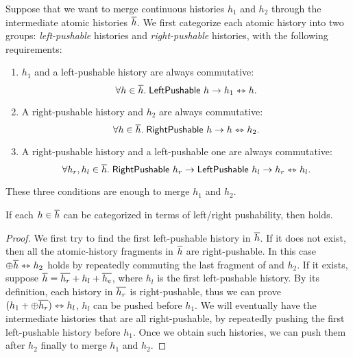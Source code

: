 Suppose that we want to merge continuous histories $h_1$ and $h_2$ through the intermediate atomic histories $\overline{h}$.
We first categorize each atomic history into two groups: \emph{left-pushable} histories and \emph{right-pushable} histories, with the following requirements:
\begin{enumerate}
\item $h_1$ and a left-pushable history are always commutative:
  \begin{displaymath}
    \forall h \in \overline{h}.\; \mathsf{LeftPushable}\ h \to h_1 \leftrightarrowtriangle h.
  \end{displaymath}
\item A right-pushable history and $h_2$ are always commutative:
  \begin{displaymath}
    \forall h \in \overline{h}.\; \mathsf{RightPushable}\ h \to h \leftrightarrowtriangle h_2.
  \end{displaymath}
\item A right-pushable history and a left-pushable one are always commutative:
  \begin{displaymath}
    \forall h_r, h_l \in \overline{h}.\; \mathsf{RightPushable}\ h_r \to \mathsf{LeftPushable}\ h_l \to h_r \leftrightarrowtriangle h_l.
  \end{displaymath}
\end{enumerate}

These three conditions are enough to merge $h_1$ and $h_2$.
\begin{theorem}\label{thm-push-imp-mgb}
  If each $h \in \overline{h}$ can be categorized in terms of left/right pushability, then  holds.
\end{theorem}
\begin{proof}
  We first try to find the first left-pushable history in $\overline{h}$.
  If it does not exist, then all the atomic-history fragments in $\overline{h}$ are right-pushable.
  In this case $\oplus \overline{h} \leftrightarrowtriangle h_2$ holds by repeatedly commuting the last fragment of  and $h_2$.
  If it exists, suppose $\overline{h} = \overline{h_r} + h_l + \overline{h_e}$, where $h_l$ is the first left-pushable history.
  By its definition, each history in $\overline{h_r}$ is right-pushable, thus we can prove $(h_1 + \oplus \overline{h_r}) \leftrightarrowtriangle h_l$, \ie{} $h_l$ can be pushed before $h_1$.
  We will eventually have the intermediate histories that are all right-pushable, by repeatedly pushing the first left-pushable history before $h_1$.
  Once we obtain such histories, we can push them after $h_2$ finally to merge $h_1$ and $h_2$.
\end{proof}

